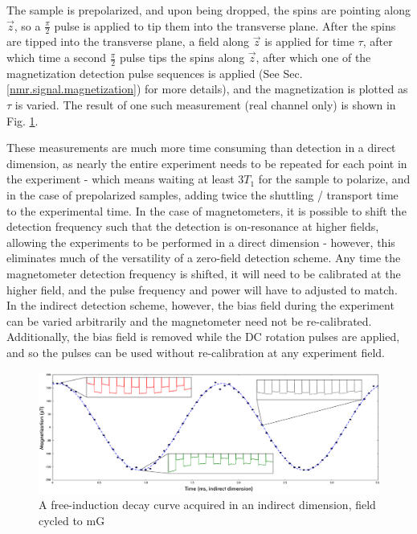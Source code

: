 \documentclass[PaulGanssle-Thesis.tex]{subfiles}
\begin{document}
The sample is prepolarized, and upon being dropped, the spins are pointing along $\vec{z}$, so a $\tfrac{\pi}{2}$ pulse is applied to tip them into the transverse plane. After the spins are tipped into the transverse plane, a field along $\vec{z}$ is applied for time $\tau$, after which time a second $\tfrac{\pi}{2}$ pulse tips the spins along $\vec{z}$, after which one of the magnetization detection pulse sequences is applied (See Sec. \ref{nmr.signal.magnetization}) for more details), and the magnetization is plotted as $\tau$ is varied. The result of one such measurement (real channel only) is shown in Fig. \ref{fig:FIDIndirectResult}.

These measurements are much more time consuming than detection in a direct dimension, as nearly the entire experiment needs to be repeated for each point in the experiment - which means waiting at least $3T_{1}$ for the sample to polarize, and in the case of prepolarized samples, adding twice the shuttling / transport time to the experimental time. In the case of magnetometers, it is possible to shift the detection frequency such that the detection is on-resonance at higher fields, allowing the experiments to be performed in a direct dimension - however, this eliminates much of the versatility of a zero-field detection scheme. Any time the magnetometer detection frequency is shifted, it will need to be calibrated at the higher field, and the pulse frequency and power will have to adjusted to match. In the indirect detection scheme, however, the bias field during the experiment can be varied arbitrarily and the magnetometer need not be re-calibrated. Additionally, the bias field is removed while the DC rotation pulses are applied, and so the pulses can be used without re-calibration at any experiment field. 


\begin{figure}[ht!]
\includegraphics[width=\tw]{figures/relaxometry/12-07-17-WaterFID.png}
\caption{A free-induction decay curve acquired in an indirect dimension, field cycled to \unit[139]{mG}}
\label{fig:FIDIndirectResult}
\end{figure}
\end{document}
